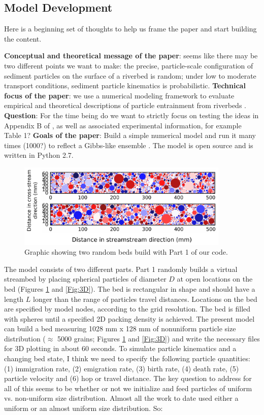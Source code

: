 \documentclass[12pt]{article}
\begin{document}
\subsection{Model Development}
Here is a beginning set of thoughts to help us frame the paper and start building the content.
\begin{outline}[enumerate]
\1 \textbf{Conceptual and theoretical message of the paper}: seems like there may be two different points we want to make:
	\2 the precise, particle-scale configuration of sediment particles on the surface of a riverbed is random;
	\2 under low to moderate transport conditions, sediment particle kinematics is probabilistic.
\1 \textbf{Technical focus of the paper}: we use a numerical modeling framework to evaluate empirical and theoretical descriptions of particle entrainment from riverbeds \citep[e.g.]{Ancey2010JGR}. 
	\2 \textbf{Question}: For the time being do we want to strictly focus on testing the ideas in Appendix B of \citet[e.g.]{Ancey2010JGR}, as well as associated experimental information, for example Table 1?
\1 \textbf{Goals of the paper}: Build a simple numerical model and run it many times (1000?) to reflect a Gibbs-like ensemble \citep{Fathel2015}. The model is open source and is written in Python 2.7.
\end{outline}
\begin{figure}[!ht]
	\centering
		\includegraphics[width=0.90\textwidth]{Figures/Random_Beds.pdf}
		\caption{Graphic showing two random beds build with Part 1 of our code.}
	\label{Fig:RandomBed}
\end{figure}
The model consists of two different parts. Part 1 randomly builds a virtual streambed by placing spherical particles of diameter $D$ at open locations on the bed (Figures \ref{Fig:RandomBed} and \ref{Fig:3D}). The bed is rectangular in shape and should have a length $L$ longer than the range of particles travel distances. Locations on the bed are specified by model nodes, according to the grid resolution. The bed is filled with spheres until a specified 2D packing density is achieved. The present model can build a bed measuring 1028 mm x 128 mm of nonuniform particle size distribution ($\approx$ 5000 grains; Figures \ref{Fig:RandomBed} and \ref{Fig:3D}) and write the necessary files for 3D plotting in about 60 seconds. To simulate particle kinematics and a changing bed state, I think we need to specify the following particle quantities: (1) immigration rate, (2) emigration rate, (3) birth rate, (4) death rate, (5) particle velocity and (6) hop or travel distance. The key question to address for all of this seems to be whether or not we initialize and feed particles of uniform vs. non-uniform size distribution. Almost all the work to date used either a uniform or an almost uniform size distribution. So:
\end{document}
